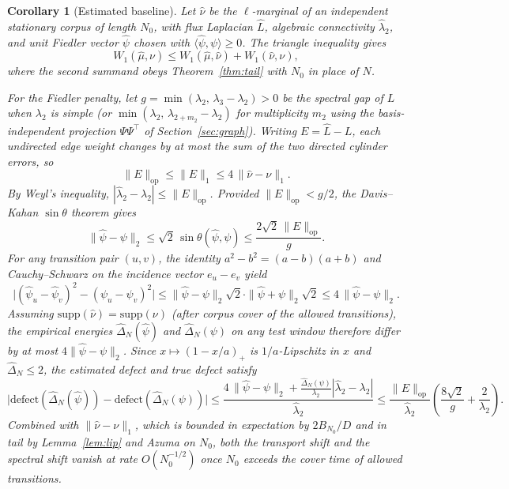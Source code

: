 \documentclass[11pt,reqno]{amsart}
\newtheorem{corollary}[theorem]{Corollary}
\theoremstyle{remark}
\newcommand{\op}{\mathrm{op}}
\newcommand{\defect}{\mathrm{defect}}
\newcommand{\supp}{\mathrm{supp}}
\begin{document}
\begin{corollary}[Estimated baseline]\label{cor:estimated}
Let $\hat\nu$ be the $\ell$-marginal of an independent stationary corpus of length $N_0$, with flux Laplacian $\hat L$, algebraic connectivity $\hat\lambda_2$, and unit Fiedler vector $\hat\psi$ chosen with $\langle \hat\psi, \psi \rangle \ge 0$. The triangle inequality gives
\[
W_1(\hat\mu, \nu) \le W_1(\hat\mu, \hat\nu) + W_1(\hat\nu, \nu),
\]
where the second summand obeys Theorem~\ref{thm:tail} with $N_0$ in place of $N$.

For the Fiedler penalty, let $g = \min(\lambda_2,\, \lambda_3 - \lambda_2) > 0$ be the spectral gap of $L$ when $\lambda_2$ is simple (or $\min(\lambda_2,\, \lambda_{2+m_2}-\lambda_2)$ for multiplicity $m_2$ using the basis-independent projection $\Psi\Psi^\top$ of Section~\ref{sec:graph}). Writing $E = \hat L - L$, each undirected edge weight changes by at most the sum of the two directed cylinder errors, so
\[
\|E\|_{\op} \le \|E\|_1 \le 4\,\|\hat\nu - \nu\|_1.
\]
By Weyl's inequality, $|\hat\lambda_2 - \lambda_2| \le \|E\|_{\op}$. Provided $\|E\|_{\op} < g/2$, the Davis--Kahan $\sin\theta$ theorem gives
\[
\|\hat\psi - \psi\|_2 \le \sqrt{2}\,\sin\theta(\hat\psi, \psi) \le \frac{2\sqrt{2}\,\|E\|_{\op}}{g}.
\]
For any transition pair $(u,v)$, the identity $a^2 - b^2 = (a-b)(a+b)$ and Cauchy--Schwarz on the incidence vector $e_u - e_v$ yield
\[
\bigl|(\hat\psi_u - \hat\psi_v)^2 - (\psi_u - \psi_v)^2\bigr|
\le
\|\hat\psi - \psi\|_2 \sqrt{2} \cdot \|\hat\psi + \psi\|_2 \sqrt{2}
\le
4\,\|\hat\psi - \psi\|_2.
\]
Assuming $\supp(\hat\nu) = \supp(\nu)$ (after corpus cover of the allowed transitions), the empirical energies $\hat\Delta_N(\hat\psi)$ and $\hat\Delta_N(\psi)$ on any test window therefore differ by at most $4\|\hat\psi - \psi\|_2$. Since $x \mapsto (1 - x/a)_+$ is $1/a$-Lipschitz in $x$ and $\hat\Delta_N \le 2$, the estimated defect and true defect satisfy
\[
\bigl|\widehat{\defect}(\hat\Delta_N(\hat\psi)) - \defect(\hat\Delta_N(\psi))\bigr|
\le
\frac{4\,\|\hat\psi - \psi\|_2 + \frac{\hat\Delta_N(\psi)}{\lambda_2}|\hat\lambda_2 - \lambda_2|}{\hat\lambda_2}
\le
\frac{\|E\|_{\op}}{\hat\lambda_2}\left(\frac{8\sqrt{2}}{g} + \frac{2}{\lambda_2}\right).
\]
Combined with $\|\hat\nu - \nu\|_1$, which is bounded in expectation by $2 B_{N_0}/D$ and in tail by Lemma~\ref{lem:lip} and Azuma on $N_0$, both the transport shift and the spectral shift vanish at rate $O(N_0^{-1/2})$ once $N_0$ exceeds the cover time of allowed transitions.
\end{corollary}
\end{document}
